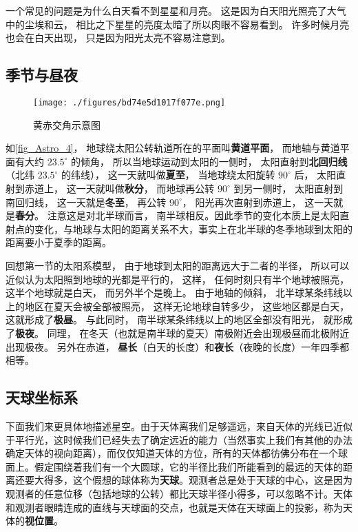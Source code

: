 一个常见的问题是为什么白天看不到星星和月亮。 这是因为白天阳光照亮了大气中的尘埃和云， 相比之下星星的亮度太暗了所以肉眼不容易看到。 许多时候月亮也会在白天出现， 只是因为阳光太亮不容易注意到。

\subsection{季节与昼夜}

\begin{figure}[ht]
\centering
\texttt{[image: ./figures/bd74e5d1017f077e.png]}
\caption{黄赤交角示意图} \label{fig_Astro_4}
\end{figure}

如\autoref{fig_Astro_4}， 地球绕太阳公转轨道所在的平面叫\textbf{黄道平面}， 而地轴与黄道平面有大约 $23.5^\circ$ 的倾角， 所以当地球运动到太阳的一侧时， 太阳直射到\textbf{北回归线}（北纬 $23.5^\circ$ 的纬线）， 这一天就叫做\textbf{夏至}， 当地球绕太阳旋转 $90^\circ$ 后， 太阳直射到赤道上， 这一天就叫做\textbf{秋分}， 而地球再公转 $90^\circ$ 到另一侧时， 太阳直射到南回归线， 这一天就是\textbf{冬至}， 再公转 $90^\circ$， 阳光再次直射到赤道上， 这一天就是\textbf{春分}。 注意这是对北半球而言， 南半球相反。因此季节的变化本质上是太阳直射点的变化，与地球与太阳的距离关系不大，事实上在北半球的冬季地球到太阳的距离要小于夏季的距离。 

回想第一节的太阳系模型， 由于地球到太阳的距离远大于二者的半径， 所以可以近似认为太阳照到地球的光都是平行的， %
这样， 任何时刻只有半个地球被照亮， 这半个地球就是白天， 而另外半个是晚上。 由于地轴的倾斜， 北半球某条纬线以上的地区在夏天会被全部被照亮， 这样无论地球自转多少， 这些地区都是白天， 这就形成了\textbf{极昼}。 与此同时， 南半球某条纬线以上的地区全部没有阳光， 就形成了\textbf{极夜}。 同理， 在冬天（也就是南半球的夏天）南极附近会出现极昼而北极附近出现极夜。 另外在赤道， \textbf{昼长}（白天的长度）和\textbf{夜长}（夜晚的长度）一年四季都相等。

\subsection{天球坐标系}

下面我们来更具体地描述星空。由于天体离我们足够遥远，来自天体的光线已近似于平行光，这时候我们已经失去了确定远近的能力（当然事实上我们有其他的办法确定天体的视向距离），而仅仅知道天体的方位，所有的天体都彷佛分布在一个球面上。假定围绕着我们有一个大圆球，它的半径比我们所能看到的最远的天体的距离还要大得多，这个假想的球体称为\textbf{天球}。观测者总是处于天球的中心，这是因为观测者的任意位移（包括地球的公转）都比天球半径小得多，可以忽略不计。天体和观测者眼睛连成的直线与天球面的交点，也就是天体在天球面上的投影，称为天体的\textbf{视位置}。

